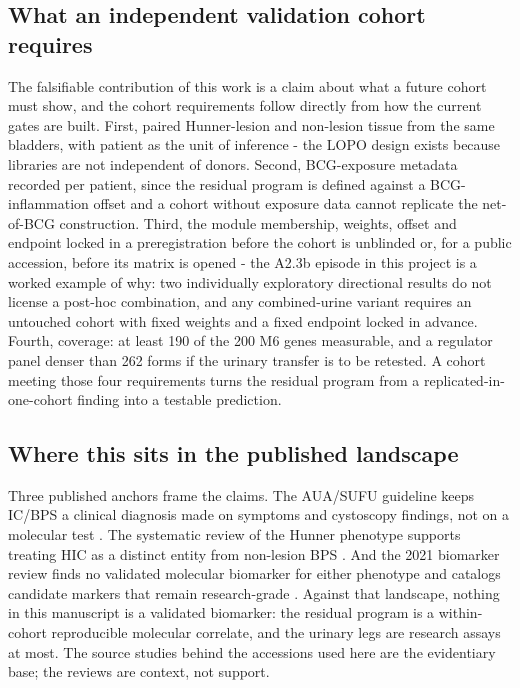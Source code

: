 \documentclass[11pt,a4paper]{article}
\begin{document}
\subsection{What an independent validation cohort requires}
The falsifiable contribution of this work is a claim about what a future
cohort must show, and the cohort requirements follow directly from how the
current gates are built. First, paired Hunner-lesion and non-lesion tissue
from the same bladders, with patient as the unit of inference - the LOPO
design exists because libraries are not independent of donors. Second,
BCG-exposure metadata recorded per patient, since the residual program is
defined against a BCG-inflammation offset and a cohort without exposure data
cannot replicate the net-of-BCG construction. Third, the module membership,
weights, offset and endpoint locked in a preregistration before the cohort is
unblinded or, for a public accession, before its matrix is opened - the A2.3b
episode in this project is a worked example of why: two individually
exploratory directional results do not license a post-hoc combination, and
any combined-urine variant requires an untouched cohort with fixed weights
and a fixed endpoint locked in advance. Fourth, coverage: at least 190 of the
200 M6 genes measurable, and a regulator panel denser than 262 forms if the
urinary transfer is to be retested. A cohort meeting those four requirements
turns the residual program from a replicated-in-one-cohort finding into a
testable prediction.

\subsection{Where this sits in the published landscape}
Three published anchors frame the claims. The AUA/SUFU guideline keeps IC/BPS
a clinical diagnosis made on symptoms and cystoscopy findings, not on a
molecular test \cite{clemens2022}. The systematic review of the Hunner
phenotype supports treating HIC as a distinct entity from non-lesion BPS
\cite{lai2020}. And the 2021 biomarker review finds no validated molecular
biomarker for either phenotype and catalogs candidate markers that remain
research-grade \cite{akiyama2021}. Against that landscape, nothing in this
manuscript is a validated biomarker: the residual program is a within-cohort
reproducible molecular correlate, and the urinary legs are research assays at
most. The source studies behind the accessions used here
\cite{akiyama2023,keay2003,gamo2009,colaco2012,walker2014,blalock2008} are
the evidentiary base; the reviews are context, not support.
\end{document}

